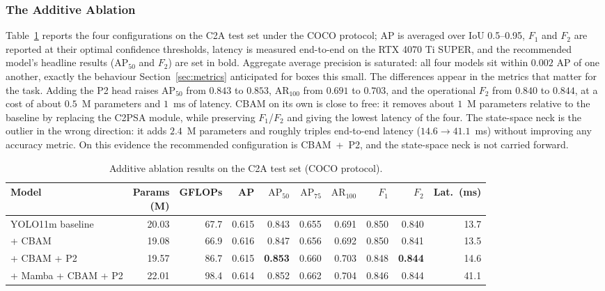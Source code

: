 \documentclass[12pt,a4paper,oneside]{report}
\begin{document}
\subsubsection{The Additive Ablation}
Table~\ref{tab:main} reports the four configurations on the C2A test set
under the COCO protocol; AP is averaged over IoU 0.5--0.95, $F_1$ and $F_2$
are reported at their optimal confidence thresholds, latency is measured
end-to-end on the RTX 4070 Ti SUPER, and the recommended model's headline
results ($\mathrm{AP}_{50}$ and $F_2$) are set in bold. Aggregate average
precision is saturated: all
four models sit within $0.002$ AP of one another, exactly the behaviour
Section~\ref{sec:metrics} anticipated for boxes this small. The differences
appear in the metrics that matter for the task. Adding the P2 head raises
$\mathrm{AP}_{50}$ from $0.843$ to $0.853$, $\mathrm{AR}_{100}$ from $0.691$
to $0.703$, and the operational $F_2$ from $0.840$ to $0.844$, at a cost of
about $0.5$~M parameters and $1$~ms of latency. CBAM on its own is close to
free: it removes about $1$~M parameters relative to the baseline by replacing
the C2PSA module, while preserving $F_1$/$F_2$ and giving the lowest latency
of the four. The state-space neck
is the outlier in the wrong direction: it adds $2.4$~M parameters and
roughly triples end-to-end latency ($14.6 \to 41.1$~ms) without improving
any accuracy metric. On this evidence the recommended configuration is
CBAM~+~P2, and the state-space neck is not carried forward.

\begin{table}[tbp]
  \centering
  \caption{Additive ablation results on the C2A test set (COCO protocol).}
  \label{tab:main}
  \small
  \setlength{\tabcolsep}{3pt}
  \begin{tabular}{|l|r|r|r|r|r|r|r|r|r|}
    \hline
    Model & \makecell{Params\\(M)} & GFLOPs & AP & $\mathrm{AP}_{50}$ & $\mathrm{AP}_{75}$ & $\mathrm{AR}_{100}$ & $F_1$ & $F_2$ & Lat.\ (ms) \\
    \hline
    YOLO11m baseline    & 20.03 & 67.7 & 0.615 & 0.843 & 0.655 & 0.691 & 0.850 & 0.840 & 13.7 \\ \hline
    + CBAM              & 19.08 & 66.9 & 0.616 & 0.847 & 0.656 & 0.692 & 0.850 & 0.841 & 13.5 \\ \hline
    + CBAM + P2         & 19.57 & 86.7 & 0.615 & \textbf{0.853} & 0.660 & 0.703 & 0.848 & \textbf{0.844} & 14.6 \\ \hline
    + Mamba + CBAM + P2 & 22.01 & 98.4 & 0.614 & 0.852 & 0.662 & 0.704 & 0.846 & 0.844 & 41.1 \\
    \hline
  \end{tabular}
\end{table}
\end{document}
